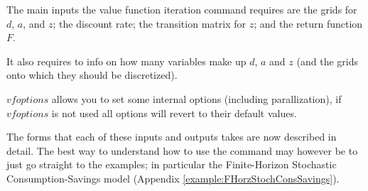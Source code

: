 The main inputs the value function iteration command requires are the grids for $d$, $a$, and $z$; the discount rate; the transition matrix for $z$; and the
return function $F$.

It also requires to info on how many variables make up $d$, $a$ and $z$ (and the grids onto which they should be discretized).

$vfoptions$ allows you to set some internal options (including parallization), if $vfoptions$ is not used all options will revert to their default values.

The forms that each of these inputs and outputs takes are now described in detail. The best way to understand how to use the
command may however be to just go straight to the examples; in particular the Finite-Horizon Stochastic Consumption-Savings model (Appendix \ref{example:FHorzStochConsSavings}).

